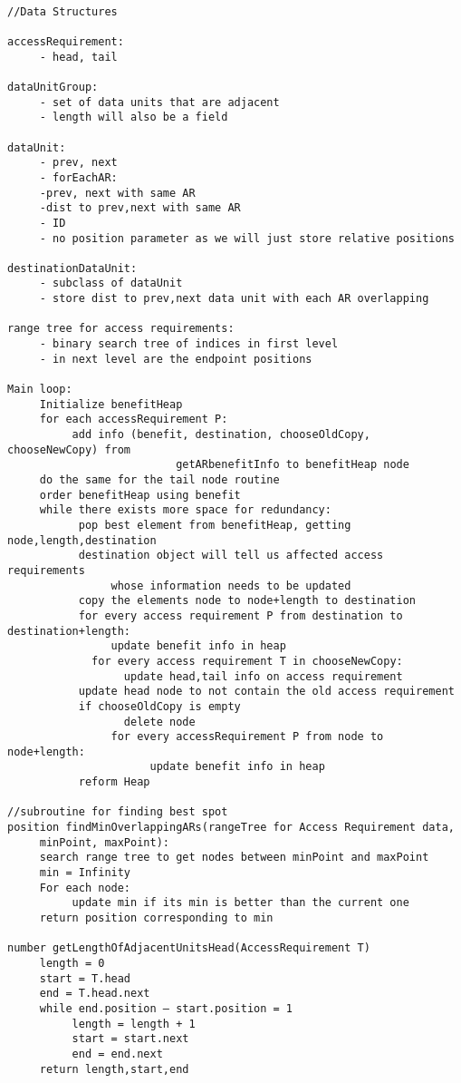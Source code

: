 \documentclass[11pt,psfig]{article}
\begin{document}
\begin{verbatim}

//Data Structures

accessRequirement:
     - head, tail

dataUnitGroup:
     - set of data units that are adjacent
     - length will also be a field

dataUnit:
     - prev, next
     - forEachAR:
     -prev, next with same AR
     -dist to prev,next with same AR
     - ID
     - no position parameter as we will just store relative positions

destinationDataUnit:
     - subclass of dataUnit
     - store dist to prev,next data unit with each AR overlapping

range tree for access requirements:
     - binary search tree of indices in first level
     - in next level are the endpoint positions

Main loop:
     Initialize benefitHeap
     for each accessRequirement P:
          add info (benefit, destination, chooseOldCopy, chooseNewCopy) from   
					      getARbenefitInfo to benefitHeap node
     do the same for the tail node routine
     order benefitHeap using benefit
     while there exists more space for redundancy:
           pop best element from benefitHeap, getting node,length,destination
           destination object will tell us affected access requirements 
                whose information needs to be updated
           copy the elements node to node+length to destination
           for every access requirement P from destination to destination+length:
                update benefit info in heap
	         for every access requirement T in chooseNewCopy:
	              update head,tail info on access requirement
           update head node to not contain the old access requirement
           if chooseOldCopy is empty
	              delete node
                for every accessRequirement P from node to node+length:
                      update benefit info in heap
           reform Heap

//subroutine for finding best spot
position findMinOverlappingARs(rangeTree for Access Requirement data, 
     minPoint, maxPoint):
     search range tree to get nodes between minPoint and maxPoint
     min = Infinity
     For each node:
          update min if its min is better than the current one
     return position corresponding to min

number getLengthOfAdjacentUnitsHead(AccessRequirement T)
     length = 0
     start = T.head
     end = T.head.next
     while end.position – start.position = 1 
          length = length + 1
          start = start.next
          end = end.next
     return length,start,end


\end{verbatim}
\end{document}
